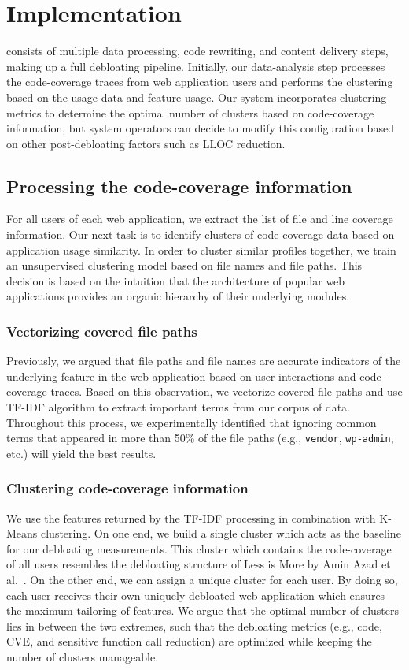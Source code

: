 \section{Implementation}

\sys{} consists of multiple data processing, code rewriting, and content delivery steps, making up a full debloating pipeline. 
Initially, our data-analysis step processes the code-coverage traces from web application users and performs the clustering based on the usage data and feature usage. 
Our system incorporates clustering metrics to determine the optimal number of clusters based on code-coverage information, but system operators can decide to modify this configuration based on other post-debloating factors such as LLOC reduction. 

\subsection{Processing the code-coverage information}

For all users of each web application, we extract the list of file and line coverage information. 
Our next task is to identify clusters of code-coverage data based on application usage similarity. 
In order to cluster similar profiles together, we train an unsupervised clustering model based on file names and file paths. 
This decision is based on the intuition that the architecture of popular web applications provides an organic hierarchy of their underlying modules. 

\subsubsection{Vectorizing covered file paths} 
Previously, we argued that file paths and file names are accurate indicators of the underlying feature in the web application based on user interactions and code-coverage traces. 
Based on this observation, we vectorize covered file paths and use TF-IDF algorithm to extract important terms from our corpus of data. 
Throughout this process, we experimentally identified that ignoring common terms that appeared in more than 50\% of the file paths (e.g., \texttt{vendor}, \texttt{wp-admin}, etc.) will yield the best results. 


\subsubsection{Clustering code-coverage information} We use the features returned by the TF-IDF processing in combination with K-Means clustering. 
On one end, we build a single cluster which acts as the baseline for our debloating measurements. 
This cluster which contains the code-coverage of all users resembles the debloating structure of Less is More by Amin Azad et al.~\cite{lessismore}. 
On the other end, we can assign a unique cluster for each user. 
By doing so, each user receives their own uniquely debloated web application which ensures the maximum tailoring of features. 
We argue that the optimal number of clusters lies in between the two extremes, such that the debloating metrics (e.g., code, CVE, and sensitive function call reduction) are optimized while keeping the number of clusters manageable. 

